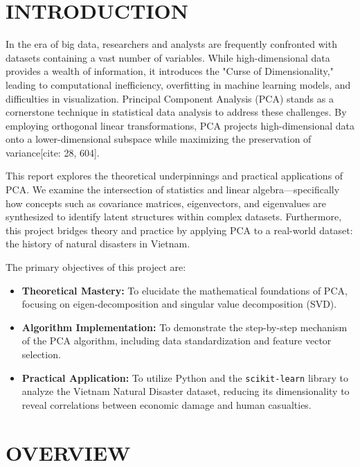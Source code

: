 \documentclass[12pt, a4paper]{report}
\begin{document}
\newpage
{} 
\chapter*{\MakeUppercase{Introduction}}

In the era of big data, researchers and analysts are frequently confronted with datasets containing a vast number of variables. While high-dimensional data provides a wealth of information, it introduces the "Curse of Dimensionality," leading to computational inefficiency, overfitting in machine learning models, and difficulties in visualization. Principal Component Analysis (PCA) stands as a cornerstone technique in statistical data analysis to address these challenges. By employing orthogonal linear transformations, PCA projects high-dimensional data onto a lower-dimensional subspace while maximizing the preservation of variance[cite: 28, 604].

This report explores the theoretical underpinnings and practical applications of PCA. We examine the intersection of statistics and linear algebra—specifically how concepts such as covariance matrices, eigenvectors, and eigenvalues are synthesized to identify latent structures within complex datasets. Furthermore, this project bridges theory and practice by applying PCA to a real-world dataset: the history of natural disasters in Vietnam.

The primary objectives of this project are:
\begin{itemize}
    \item \textbf{Theoretical Mastery:} To elucidate the mathematical foundations of PCA, focusing on eigen-decomposition and singular value decomposition (SVD).
    \item \textbf{Algorithm Implementation:} To demonstrate the step-by-step mechanism of the PCA algorithm, including data standardization and feature vector selection.
    \item \textbf{Practical Application:} To utilize Python and the \texttt{scikit-learn} library to analyze the Vietnam Natural Disaster dataset, reducing its dimensionality to reveal correlations between economic damage and human casualties.
\end{itemize}

\newpage
\chapter{\MakeUppercase{Overview}}
\end{document}
